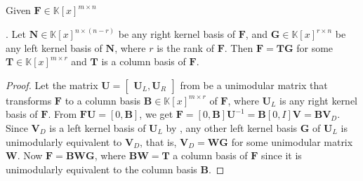 \begin{lem}
\label{lem:matrixGCD}Given $\mathbf{F}\in\mathbb{K}\left[x\right]^{m\times n}$%
\begin{comment}
 and has full row rank
\end{comment}
. Let $\mathbf{N}\in\mathbb{K}\left[x\right]^{n\times(n-r)}$ be any
right kernel basis of $\mathbf{F}$, and $\mathbf{G}\in\mathbb{K}\left[x\right]^{r\times n}$
be any left kernel basis of $\mathbf{N}$, where $r$ is the rank
of $\mathbf{F}$. Then $\mathbf{F}=\mathbf{T}\mathbf{G}$ for some
$\mathbf{T}\in\mathbb{K}\left[x\right]^{m\times r}$ and $\mathbf{T}$
is a column basis of $\mathbf{F}$.\end{lem}
\begin{proof}
Let the matrix $\mathbf{U}=\begin{bmatrix}\mathbf{U}_{L},\mathbf{U}_{R}\end{bmatrix}$
from  be a unimodular
matrix that transforms $\mathbf{F}$ to a column basis $\mathbf{B}\in\mathbb{K}\left[x\right]^{m\times r}$
of $\mathbf{F}$, where $\mathbf{U}_{L}$ is any right kernel basis
of $\mathbf{F}$. From $\mathbf{F}\mathbf{U}=\left[0,\mathbf{B}\right]$,
we get\textbf{ $\mathbf{F}=\left[0,\mathbf{B}\right]\mathbf{U}^{-1}=\mathbf{B}\left[0,I\right]\mathbf{V}=\mathbf{B}\mathbf{V}_{D}$}.
Since $\mathbf{V}_{D}$ is a left kernel basis of\textbf{ $\mathbf{U}_{L}$}
by , any other left
kernel basis $\mathbf{G}$ of $\mathbf{U}_{L}$ is unimodularly equivalent
to $\mathbf{V}_{D}$, that is, $\mathbf{V}_{D}=\mathbf{W}\mathbf{G}$
for some unimodular matrix $\mathbf{W}$. Now $\mathbf{F}=\mathbf{B}\mathbf{W}\mathbf{G}$,
where $\mathbf{BW}=\mathbf{T}$ a column basis of $\mathbf{F}$ since
it is unimodularly equivalent to the column basis $\mathbf{B}$.
\end{proof}


